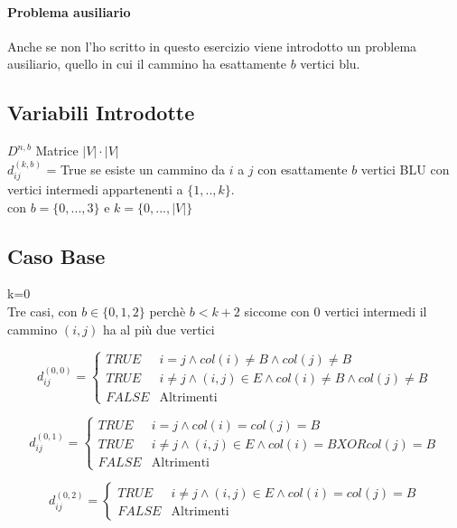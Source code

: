 \documentclass[12pt, a4paper, openany]{book}
\begin{document}
\paragraph*{Problema ausiliario} Anche se non l'ho scritto in questo esercizio viene introdotto un problema ausiliario, quello in cui il cammino ha esattamente $b$ vertici blu.
\subsection*{Variabili Introdotte}
$D^{n,b}$ Matrice $|V|\cdot|V|$\\
$d^{(k,b)}_{ij}$ = True se esiste un cammino da $i$ a $j$ con esattamente $b$ vertici BLU con vertici intermedi appartenenti a $\{1,..,k\}$.\\
con $b = \{0,...,3\}$ e $k=\{0,...,|V|\}$

\subsection*{Caso Base} k=0\\
Tre casi, con $b \in \{0,1,2\}$ perchè $b < k+2$ siccome con 0 vertici intermedi il cammino $(i,j)$ ha al più due vertici

\begin{equation*}
	d_{ij}^{(0,0)} = \begin{cases}
		TRUE  & i=j\land col(i)\neq B\land col(j)\neq B                      \\
		TRUE  & i\neq j\land (i,j)\in E \land col(i)\neq B\land col(j)\neq B \\
		FALSE & \text{Altrimenti}
	\end{cases}
\end{equation*}

\begin{equation*}
	d_{ij}^{(0,1)} = \begin{cases}
		TRUE  & i=j\land col(i)= col(j) = B                          \\
		TRUE  & i\neq j\land (i,j)\in E \land col(i)= B XOR col(j)=B \\
		FALSE & \text{Altrimenti}
	\end{cases}
\end{equation*}

\begin{equation*}
	d_{ij}^{(0,2)} = \begin{cases}
		TRUE  & i\neq j\land (i,j)\in E \land col(i)= col(j)= B \\
		FALSE & \text{Altrimenti}
	\end{cases}
\end{equation*}
\end{document}
